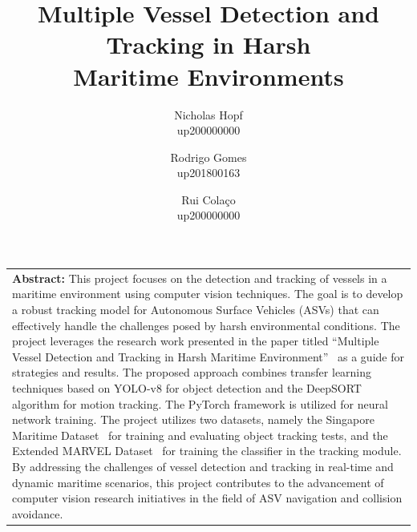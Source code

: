 \documentclass[a4paper,12pt]{article}
\title{Multiple Vessel Detection and Tracking in Harsh\\Maritime Environments}
\author{
    Nicholas Hopf\\
    up200000000
    \and
    Rodrigo Gomes\\
    up201800163
    \and
    Rui Colaço\\
    up200000000
}
\date{\vspace{-3ex}}
\begin{document}
\maketitle


\vspace{10pt}

\begin{table}[h]
	\centering
	\begin{tabular}{p{14cm}}
        {\textbf{Abstract:}} This project focuses on the detection and tracking of vessels in a maritime environment using computer vision techniques.
        The goal is to develop a robust tracking model for Autonomous Surface Vehicles (ASVs) that can effectively handle the challenges posed by harsh environmental conditions.
        The project leverages the research work presented in the paper titled ``Multiple Vessel Detection and Tracking in Harsh Maritime Environment''~\cite{MVDTHME} as a guide for strategies and results.
        The proposed approach combines transfer learning techniques based on YOLO-v8 for object detection and the DeepSORT algorithm for motion tracking.
        The PyTorch framework is utilized for neural network training.
        The project utilizes two datasets, namely the Singapore Maritime Dataset~\cite{SINGAPORE} for training and evaluating object tracking tests, and the Extended MARVEL Dataset~\cite{MARVEL} for training the classifier in the tracking module.
        By addressing the challenges of vessel detection and tracking in real-time and dynamic maritime scenarios, this project contributes to the advancement of computer vision research initiatives in the field of ASV navigation and collision avoidance.
	\end{tabular}\label{tab:abstract}
\end{table}
\end{document}
